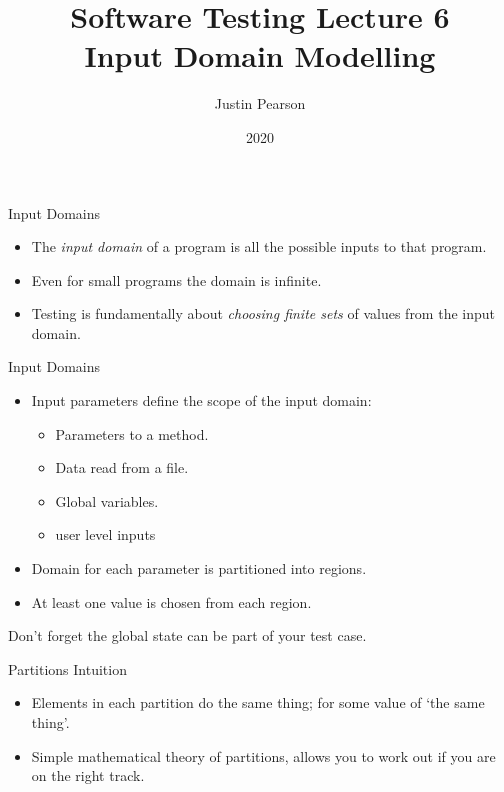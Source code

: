 \documentclass{beamer}
\title{Software Testing  Lecture 6 \\ Input Domain Modelling}
\author{Justin Pearson}
\date{2020}
\begin{document}
\lstset{language=C}

\begin{frame}
  \maketitle
\end{frame}
\begin{frame}{Input Domains}
  \begin{itemize}
  \item The {\it input domain} of a program is all the possible inputs to
    that program.
  \item Even for small programs the domain is infinite.
  \item Testing is fundamentally about {\em choosing finite sets} of
    values from the input domain.
  \end{itemize}
  
\end{frame}
\begin{frame}{Input Domains}
  \begin{itemize}
  \item Input parameters define the scope of the input domain:
    \begin{itemize}
    \item Parameters to a method.
    \item Data read from a file.
    \item Global variables.
    \item user level inputs
    \end{itemize}
  \item Domain for each parameter is partitioned into regions.
  \item At least one value is chosen from each region.
  \end{itemize}
  Don't forget the global state can be part of your test case.  
\end{frame}
\begin{frame}{Partitions Intuition} 
  \begin{itemize}
  \item Elements in each partition do the same thing; for some value
    of  `the same thing'.
  \item Simple mathematical theory of partitions, allows you to work
    out if you are on the right track.
  \end{itemize}
\end{frame}
\end{document}
